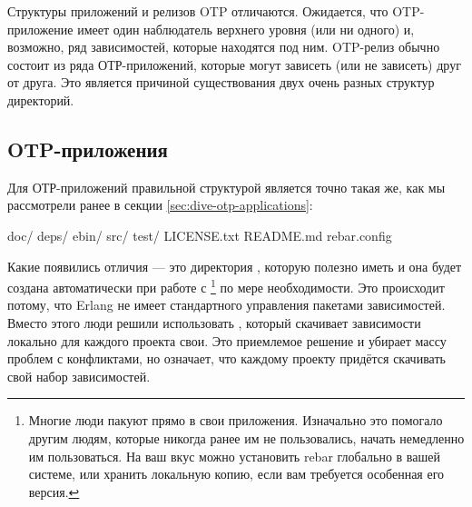 \documentclass[11pt, oneside]{book}   	%
\begin{document}
Структуры приложений и релизов OTP отличаются. Ожидается, что OTP-приложение имеет один наблюдатель верхнего уровня (или ни одного) и, возможно, ряд зависимостей, которые находятся под ним. OTP-релиз обычно состоит из ряда ОТР-приложений, которые могут зависеть (или не зависеть) друг от друга. Это является причиной существования двух очень разных структур директорий.

\subsection{OTP-приложения}
\label{subsec:building-otp-applications}

Для ОТР-приложений правильной структурой является точно такая же, как мы рассмотрели ранее в секции \ref{sec:dive-otp-applications}:

\begin{VerbatimText}
doc/
deps/
ebin/
src/
test/
LICENSE.txt
README.md
rebar.config
\end{VerbatimText}

Какие появились отличия --- это директория , которую полезно иметь и она будет создана автоматически при работе с \footnote{Многие люди пакуют  прямо в свои приложения. Изначально это помогало другим людям, которые никогда ранее им не пользовались, начать немедленно им пользоваться. На ваш вкус можно установить rebar глобально в вашей системе, или хранить локальную копию, если вам требуется особенная его версия.} по мере необходимости. Это происходит потому, что Erlang не имеет стандартного управления пакетами зависимостей. Вместо этого люди решили использовать , который скачивает зависимости локально для каждого проекта свои. Это приемлемое решение и убирает массу проблем с конфликтами, но означает, что каждому проекту придётся скачивать свой набор зависимостей.
\end{document}
